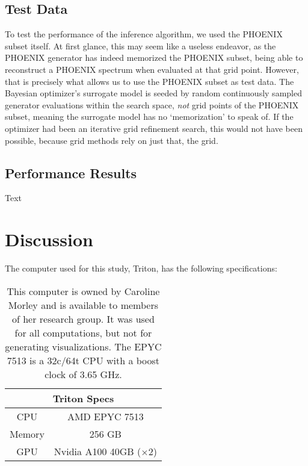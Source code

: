 \documentclass[twocolumn]{aastex631}
\begin{document}
\subsection{Test Data}
To test the performance of the inference algorithm, we used the PHOENIX subset
itself. At first glance, this may seem like a useless endeavor, as the 
PHOENIX generator has indeed memorized the PHOENIX subset, being able to
reconstruct a PHOENIX spectrum when evaluated at that grid point. However,
that is precisely what allows us to use the PHOENIX subset as test data.
The Bayesian optimizer's surrogate model is seeded by random continuously 
sampled generator evaluations within the search space, \textit{not} grid 
points of the PHOENIX subset, meaning the surrogate model has no `memorization' 
to speak of. If the optimizer had been an iterative grid refinement search, 
this would not have been possible, because grid methods rely on just that, 
the grid.

\subsection{Performance Results}
Text

\section{Discussion}
The computer used for this study, Triton, has the following specifications:
\begin{table}[h]
    \hspace*{0.6cm}\begin{tabular}{|c|c|}
        \hline
        \multicolumn{2}{|c|}{\textbf{Triton Specs}}\\
        \hline\hline
        CPU & AMD EPYC 7513\\
        Memory & 256 GB\\
        GPU & Nvidia A100 40GB ($\times$2)\\
        \hline
    \end{tabular}
    \caption{This computer is owned by Caroline Morley and is available to
    members of her research group. It was used for all computations, but not 
    for generating visualizations. The EPYC 7513 is a 32c/64t CPU with a 
    boost clock of 3.65 GHz.}
\end{table}
\end{document}
